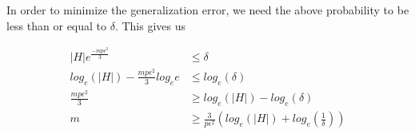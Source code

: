 \begin{enumerate}
In order to minimize the generalization error, we need the above probability to be less than or equal to $\delta$. This gives us

\begin{equation*}
\begin{aligned}
\left | H \right | e^{\frac{-mp\epsilon^2}{3}} &\leq \delta\\
log_e \left ( \left | H \right | \right ) - \frac{mp\epsilon^2}{3} log_e e &\leq log_e \left (\delta \right)\\
\frac{mp\epsilon^2}{3} &\geq log_e \left ( \left | H \right | \right ) - log_e \left (\delta \right)\\
m &\geq \frac{3}{p\epsilon^2} \left ( log_e \left ( \left | H \right | \right ) + log_e \left (\frac{1}{\delta} \right) \right )
\end{aligned}
\end{equation*}

\end{enumerate}

